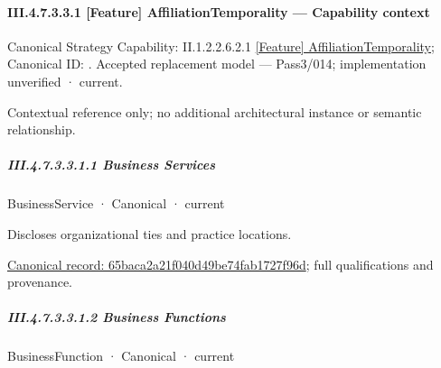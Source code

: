\paragraph*{III.4.7.3.3.1 [Feature] AffiliationTemporality — Capability context}
\label{navigation:III.4.7.3.3.1}

{\small Canonical Strategy Capability: II.1.2.2.6.2.1 \hyperref[element:6beab7cbd7ec4563a82112445a0ffe46]{[Feature] AffiliationTemporality}; Canonical ID: \texttt{}. Accepted replacement model — Pass3/014; implementation unverified · current.}\par
Contextual reference only; no additional architectural instance or semantic relationship.\par
\subparagraph*{III.4.7.3.3.1.1 Business Services}
\label{navigation:III.4.7.3.3.1.1}

\label{navigation:III.4.7.3.3.1.1.1}

\label{element:65baca2a21f040d49be74fab1727f96d}
{\small BusinessService · Canonical · current}\par

Discloses organizational ties and practice locations.


{\footnotesize \href{../../../../continuum/business/business-service/65baca2a21f040d49be74fab1727f96d.md}{Canonical record: 65baca2a21f040d49be74fab1727f96d}; full qualifications and provenance.}\par
\subparagraph*{III.4.7.3.3.1.2 Business Functions}
\label{navigation:III.4.7.3.3.1.2}

\label{navigation:III.4.7.3.3.1.2.1}

\label{element:7dc829546e99424dbbf8f19b4565d3fc}
{\small BusinessFunction · Canonical · current}\par

